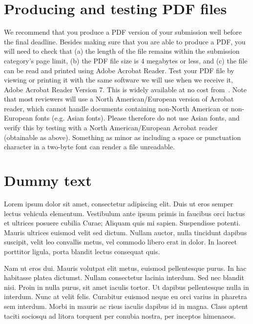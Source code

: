 \documentclass{sigchi-ext}
\begin{document}
\section{Producing and testing PDF files}
We recommend that you produce a PDF version of your submission well before the final deadline. 
Besides making sure that you are able to produce a PDF, you will need to check that (a) the length of the file remains within the submission category's page limit, (b) the PDF file size is 4 megabytes or less, and (c) the file can be read and printed using Adobe Acrobat Reader. 
Test your PDF file by viewing or printing it with the same software we will use when we receive it, Adobe Acrobat Reader Version 7. 
This is widely available at no cost from~\cite{Acrobat7}.  
Note that most reviewers will use a North American/European version of Acrobat reader, which cannot handle documents containing non-North American or non-European fonts (e.g. Asian fonts).  
Please therefore do not use Asian fonts, and verify this by testing with a North American/European Acrobat reader (obtainable as above). Something as minor as including a space or punctuation character in a two-byte font can render a file unreadable.


\section{Dummy text}
Lorem ipsum dolor sit amet, consectetur adipiscing elit. Duis ut eros semper lectus vehicula elementum. Vestibulum ante ipsum primis in faucibus orci luctus et ultrices posuere cubilia Curae; Aliquam quis mi sapien. Suspendisse potenti. Mauris ultrices euismod velit sed dictum. Nullam auctor, nulla tincidunt dapibus suscipit, velit leo convallis metus, vel commodo libero erat in dolor. In laoreet porttitor ligula, porta blandit lectus consequat quis. 

Nam ut eros dui. Mauris volutpat elit metus, euismod pellentesque purus. In hac habitasse platea dictumst. Nullam consectetur lacinia interdum. Sed nec blandit nisi. Proin in nulla purus, sit amet iaculis tortor. Ut dapibus pellentesque nulla in interdum. Nunc at velit felis. Curabitur euismod neque eu orci varius in pharetra sem interdum. Morbi in mauris ac risus iaculis dapibus id in magna. Class aptent taciti sociosqu ad litora torquent per conubia nostra, per inceptos himenaeos.
\end{document}
